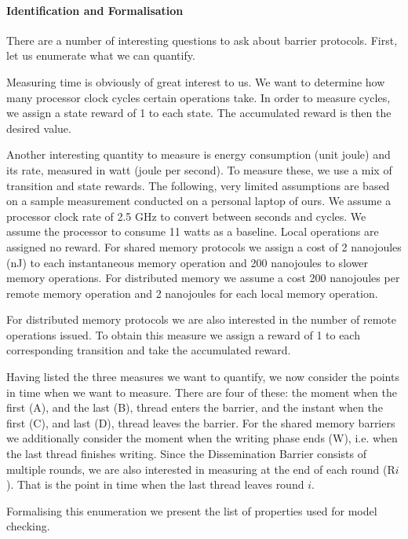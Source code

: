 \documentclass[a4paper, 10pt]{article}
\begin{document}
\paragraph{Identification and Formalisation}
\label{ssssec:analysis-modelchecking-quantitative-properties-identification}
There are a number of interesting questions to ask about barrier protocols. First, let us enumerate what we can quantify.

Measuring time is obviously of great interest to us. We want to determine how many processor clock cycles certain operations take. In order to measure cycles, we assign a state reward of 1 to each state. The accumulated reward is then the desired value.

Another interesting quantity to measure is energy consumption (unit joule) and its rate, measured in watt (joule per second).
To measure these, we use a mix of transition and state rewards.
The following, very limited assumptions are based on a sample measurement conducted on a personal laptop of ours.
We assume a processor clock rate of 2.5 GHz to convert between seconds and cycles.
We assume the processor to consume 11 watts as a baseline.
Local operations are assigned no reward.
For shared memory protocols we assign a cost of 2 nanojoules (nJ) to each instantaneous memory operation and 200 nanojoules to slower memory operations.
For distributed memory we assume a cost 200 nanojoules per remote memory operation and 2 nanojoules for each local memory operation.

For distributed memory protocols we are also interested in the number of remote operations issued. To obtain this measure we assign a reward of 1 to each corresponding transition and take the accumulated reward.

Having listed the three measures we want to quantify, we now consider the points in time when we want to measure.
There are four of these: the moment when the first (A), and the last (B), thread enters the barrier, and the instant when the first (C), and last (D), thread leaves the barrier.
For the shared memory barriers we additionally consider the moment when the writing phase ends (W), i.e. when the last thread finishes writing.
Since the Dissemination Barrier consists of multiple rounds, we are also interested in measuring at the end of each round (R$i$). That is the point in time when the last thread leaves round $i$.

Formalising this enumeration we present the list of properties used for model checking.
\end{document}
